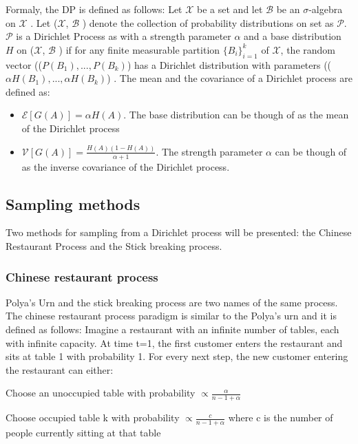 \documentclass[twoside,hidelinks]{article}
\begin{document}
Formaly, the DP is defined as follows: Let $\mathcal{X}$ be a set and let $\mathcal{B}$ be an $\sigma$-algebra on $\mathcal{X}$ .  Let ($\mathcal{X} $, $\mathcal{B}$ )  denote the collection of probability distributions on set as $\mathcal{P} $. $\mathcal{P}$ is a Dirichlet Process as with a strength parameter $\alpha$ and a base distribution $H$ on ($\mathcal{X} $, $\mathcal{B} $ ) if for any finite measurable partition $ \{B_i\}_{i=1}^k$ of $\mathcal{X} $, the random vector (($ P(B_1), ..., P(B_k)$) has a Dirichlet distribution with parameters (($ \alpha H(B_1), ..., \alpha H(B_k)$) . The mean and the covariance of a Dirichlet process are defined as:
\begin{itemize}

	\item{ $ \mathcal{E}[G(A)] = \alpha H(A) $. The base distribution can be though of as the mean of the Dirichlet process}

	\item{$ \mathcal{V}[G(A)] = \frac{H(A)(1-H(A))}{\alpha + 1} $. The strength parameter $\alpha$ can be though of as the inverse covariance of the Dirichlet process. }
\end{itemize}

\subsection{Sampling methods}

Two methods for sampling from a Dirichlet process will be presented: the Chinese Restaurant Process and the Stick breaking process.


\subsubsection{Chinese restaurant process}
\label{sec:crp}
Polya's Urn and the stick breaking process are two names of the same process. The chinese restaurant process paradigm is similar to the Polya's urn and it is defined as follows:
Imagine a restaurant with an infinite number of tables, each with infinite capacity. At time t=1, the first customer enters the restaurant and sits at table 1 with probability 1. For every next step, the new customer entering the restaurant can either: 

\begin{compactitem}
	\item Choose an unoccupied table with probability $ \propto \frac{\alpha}{n-1+ \alpha }$
	\item Choose occupied table k with probability $ \propto  \frac{c}{n-1+ \alpha }$ where c is the number of people currently sitting at that table
\end{compactitem}
\end{document}
